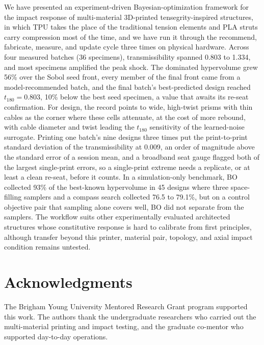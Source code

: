 \documentclass[11pt]{article}
\begin{document}
We have presented an experiment-driven Bayesian-optimization framework
for the impact response of multi-material 3D-printed tensegrity-inspired
structures, in which TPU takes the place of the traditional tension
elements and PLA struts carry compression most of the time, and we have
run it through the recommend, fabricate, measure, and update cycle three
times on physical hardware. Across four measured
batches (36 specimens), transmissibility spanned 0.803 to 1.334, and most
specimens amplified the peak shock. The dominated hypervolume grew 56\%
over the Sobol seed front, every member of the final front came from a
model-recommended batch, and the final batch's best-predicted design
reached $t_{180} = 0.803$, 10\% below the best seed specimen, a value
that awaits its re-seat confirmation. For design, the record points to
wide, high-twist prisms with thin cables as the corner where these cells
attenuate, at the cost of more rebound, with cable diameter and twist
leading the $t_{180}$ sensitivity of the learned-noise surrogate. Printing one batch's nine designs
three times put the print-to-print standard deviation of the
transmissibility at 0.009, an order of magnitude above the standard
error of a session mean, and a broadband seat gauge flagged both of the
largest single-print errors, so a single-print extreme needs a
replicate, or at least a clean re-seat, before it counts. In a
simulation-only benchmark, BO collected 93\% of the best-known
hypervolume in 45 designs where three space-filling samplers and a compass search collected 76.5 to
79.1\%, but on a control objective pair that sampling alone covers well,
BO did not separate from the samplers. The workflow suits other
experimentally evaluated architected structures whose constitutive
response is hard to calibrate from first principles, although transfer
beyond this printer, material pair, topology, and axial impact condition
remains untested.



\section*{Acknowledgments}

The Brigham Young University Mentored Research Grant program supported
this work. The authors thank the undergraduate researchers
who carried out the multi-material printing and impact testing, and the
graduate co-mentor who supported day-to-day operations.
\end{document}
